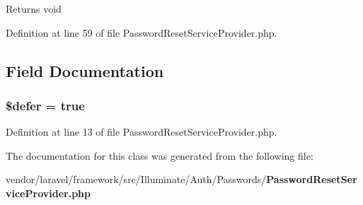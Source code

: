 \begin{DoxyReturn}{Returns}
void 
\end{DoxyReturn}


Definition at line 59 of file Password\+Reset\+Service\+Provider.\+php.



\subsection{Field Documentation}
\subsubsection[{\$defer}]{\setlength{\rightskip}{0pt plus 5cm}\$defer = true\hspace{0.3cm}{\ttfamily [protected]}}\label{class_illuminate_1_1_auth_1_1_passwords_1_1_password_reset_service_provider_af035ee3a0e66d50f2a013040b1d320b8}


Definition at line 13 of file Password\+Reset\+Service\+Provider.\+php.



The documentation for this class was generated from the following file\+:\begin{DoxyCompactItemize}
\item 
vendor/laravel/framework/src/\+Illuminate/\+Auth/\+Passwords/{\bf Password\+Reset\+Service\+Provider.\+php}\end{DoxyCompactItemize}
